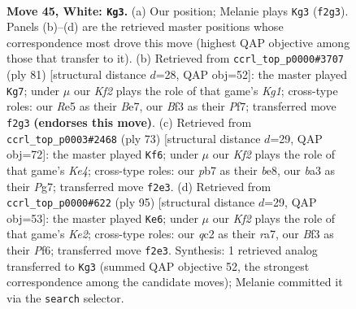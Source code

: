 \documentclass[11pt]{article}
\begin{document}
\clearpage

\begin{figure}[p]\centering
\begin{subfigure}{0.46\textwidth}\centering
\resizebox{\linewidth}{!}{%
\newchessgame
\chessboard[
  setfen={8/pp6/6pk/4R3/5P1P/b4B2/2q2K2/8 w - - 2 45},
  showmover=false,
  pgfstyle=straightmove, color=movearrow, markmove={f2-g3}
]}
\caption{}
\end{subfigure}\hfill
\begin{subfigure}{0.46\textwidth}\centering
\resizebox{\linewidth}{!}{%
\newchessgame
\chessboard[
  setfen={2Q3k1/4bp2/6pp/8/5P2/7P/6PK/1r6 b - - 0 41},
  showmover=false,
  pgfstyle=straightmove, color=movearrow, markmove={g8-g7}
]}
\caption{}
\end{subfigure}
\\[4pt]
\begin{subfigure}{0.46\textwidth}\centering
\resizebox{\linewidth}{!}{%
\newchessgame
\chessboard[
  setfen={4B3/6p1/4b3/1R2k1p1/8/5P1P/5P1K/3r4 b - - 14 37},
  showmover=false,
  pgfstyle=straightmove, color=movearrow, markmove={e5-f6}
]}
\caption{}
\end{subfigure}\hfill
\begin{subfigure}{0.46\textwidth}\centering
\resizebox{\linewidth}{!}{%
\newchessgame
\chessboard[
  setfen={8/R3k3/5p1p/8/P2p1K1P/1Pr5/3N2b1/8 b - - 3 48},
  showmover=false,
  pgfstyle=straightmove, color=movearrow, markmove={e7-e6}
]}
\caption{}
\end{subfigure}
\caption{\textbf{Move 45, White: \texttt{Kg3}.} (a) Our position; Melanie plays \texttt{Kg3} (\texttt{f2g3}). Panels (b)--(d) are the retrieved master positions whose correspondence most drove this move (highest QAP objective among those that transfer to it). (b) Retrieved from \texttt{ccrl\_top\_p0000\#3707} (ply 81) [structural distance $d$=28, QAP obj=52]: the master played \texttt{Kg7}; under $\mu$ our \emph{Kf2} plays the role of that game's \emph{Kg1}; cross-type roles: our \emph{R}e5 as their \emph{B}e7, our \emph{B}f3 as their \emph{P}f7; transferred move \texttt{f2g3} \textbf{(endorses this move)}. (c) Retrieved from \texttt{ccrl\_top\_p0003\#2468} (ply 73) [structural distance $d$=29, QAP obj=72]: the master played \texttt{Kf6}; under $\mu$ our \emph{Kf2} plays the role of that game's \emph{Ke4}; cross-type roles: our \emph{p}b7 as their \emph{b}e8, our \emph{b}a3 as their \emph{P}g7; transferred move \texttt{f2e3}. (d) Retrieved from \texttt{ccrl\_top\_p0000\#622} (ply 95) [structural distance $d$=29, QAP obj=53]: the master played \texttt{Ke6}; under $\mu$ our \emph{Kf2} plays the role of that game's \emph{Ke2}; cross-type roles: our \emph{q}c2 as their \emph{r}a7, our \emph{B}f3 as their \emph{P}f6; transferred move \texttt{f2e3}. Synthesis: 1 retrieved analog transferred to \texttt{Kg3} (summed QAP objective 52, the strongest correspondence among the candidate moves); Melanie committed it via the \texttt{search} selector.}
\label{fig:thought-m88}
\end{figure}
\end{document}
